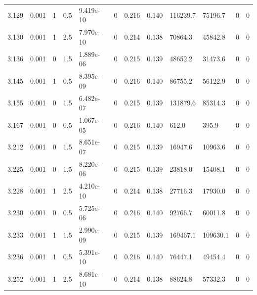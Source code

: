 \documentclass[preview]{standalone}
\begin{document}
{{{{{\begin{tabular}{L{1.2cm}C{1.2cm} C{0.3cm}C{0.5cm} C{1.4cm}C{1.4cm} C{1.4cm}C{1.4cm} C{1.6cm}C{1.6cm} C{1.6cm}C{1.6cm}}
  3.129  &  0.001  & 1     & 0.5 &  9.419e-10  & 0  &  0.216&   0.140& 116239.7 & 75196.7   &  0 & 0  \\ 
  3.130  &  0.001  & 1     & 2.5 &  7.970e-10  & 0  &  0.214&   0.138& 70864.3 & 45842.8   &  0 & 0  \\ 
  3.136  &  0.001  & 0     & 1.5 &  1.889e-06  & 0  &  0.215&   0.139& 48652.2 & 31473.6   &  0 & 0  \\ 
  3.145  &  0.001  & 1     & 0.5 &  8.395e-09  & 0  &  0.216&   0.140& 86755.2 & 56122.9   &  0 & 0  \\ 
  3.155  &  0.001  & 0     & 1.5 &  6.482e-07  & 0  &  0.215&   0.139& 131879.6 & 85314.3   &  0 & 0  \\ 
  3.167  &  0.001  & 0     & 0.5 &  1.067e-05  & 0  &  0.216&   0.140& 612.0 & 395.9   &  0 & 0  \\ 
  3.212  &  0.001  & 0     & 1.5 &  8.651e-07  & 0  &  0.215&   0.139& 16947.6 & 10963.6   &  0 & 0  \\ 
  3.225  &  0.001  & 0     & 1.5 &  8.220e-06  & 0  &  0.215&   0.139& 23818.0 & 15408.1   &  0 & 0  \\ 
  3.228  &  0.001  & 1     & 2.5 &  4.210e-10  & 0  &  0.214&   0.138& 27716.3 & 17930.0   &  0 & 0  \\ 
  3.230  &  0.001  & 0     & 0.5 &  5.725e-06  & 0  &  0.216&   0.140& 92766.7 & 60011.8   &  0 & 0  \\ 
  3.233  &  0.001  & 1     & 1.5 &  2.990e-09  & 0  &  0.215&   0.139& 169467.1 & 109630.1   &  0 & 0  \\ 
  3.236  &  0.001  & 1     & 0.5 &  5.391e-10  & 0  &  0.216&   0.140& 76447.1 & 49454.4   &  0 & 0  \\ 
  3.252  &  0.001  & 1     & 2.5 &  8.681e-10  & 0  &  0.214&   0.138& 88624.8 & 57332.3   &  0 & 0  \\ 
\hline 
\end{tabular} 

}}}}}
\end{document}
